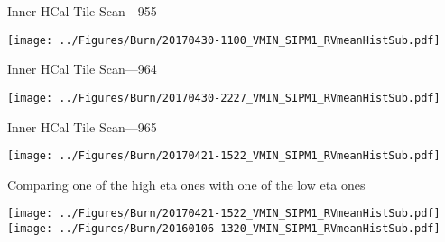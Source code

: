 \documentclass[compress,8pt]{beamer} %
\begin{document}
\begin{frame}{Inner HCal Tile Scan---955}
\begin{adjustwidth}{-3em}{-3em}
\begin{center}
\texttt{[image: ../Figures/Burn/20170430-1100\_VMIN\_SIPM1\_RVmeanHistSub.pdf]}
\end{center}
\end{adjustwidth}
\end{frame}

\begin{frame}{Inner HCal Tile Scan---964}
\begin{adjustwidth}{-3em}{-3em}
\begin{center}
\texttt{[image: ../Figures/Burn/20170430-2227\_VMIN\_SIPM1\_RVmeanHistSub.pdf]}
\end{center}
\end{adjustwidth}
\end{frame}

\begin{frame}{Inner HCal Tile Scan---965}
\begin{adjustwidth}{-3em}{-3em}
\begin{center}
\texttt{[image: ../Figures/Burn/20170421-1522\_VMIN\_SIPM1\_RVmeanHistSub.pdf]}
\end{center}
\end{adjustwidth}
\end{frame}


\begin{frame}{Comparing one of the high eta ones with one of the low eta ones}
\begin{adjustwidth}{-3em}{-3em}
\begin{center}
\texttt{[image: ../Figures/Burn/20170421-1522\_VMIN\_SIPM1\_RVmeanHistSub.pdf]} \\
\texttt{[image: ../Figures/Burn/20160106-1320\_VMIN\_SIPM1\_RVmeanHistSub.pdf]}
\end{center}
\end{adjustwidth}
\end{frame}
\end{document}
